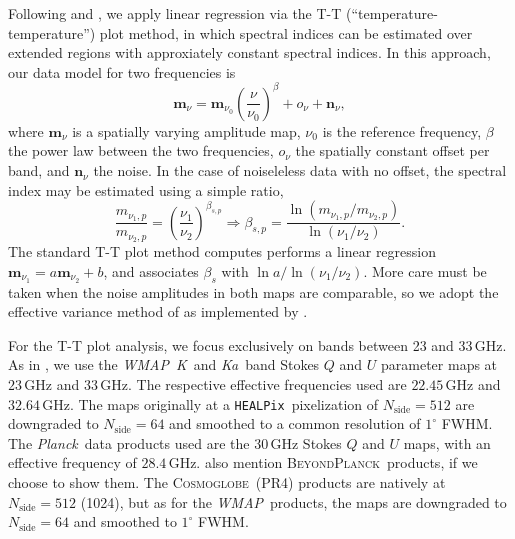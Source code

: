 \documentclass[twocolumn]{../../common/aa}
\def\WMAP{\emph{WMAP}}
\def\Planck{\emph{Planck}}
\def\healpix{\texttt{HEALPix}}
\newcommand{\red}[0]{\color{red}}
\newcommand{\BP}{\textsc{BeyondPlanck}}
\newcommand{\cosmoglobe}{\textsc{Cosmoglobe}}
\newcommand{\K}[0]{\textit K}
\newcommand{\Ka}[0]{\textit{Ka}}
\begin{document}
Following \citet{fuskeland2014} and \citet{fuskeland:2019}, we apply linear regression via the T-T (``temperature-temperature'') plot method, in which spectral indices can be estimated over extended regions with approxiately constant spectral indices. In this approach, our data model for two frequencies is
\begin{equation}
	\boldsymbol m_\nu = \boldsymbol m_{\nu_0}\left(\frac\nu{\nu_0}\right)^\beta+o_\nu+\boldsymbol n_\nu ,
\end{equation}
where $\boldsymbol m_\nu$ is a spatially varying amplitude map, $\nu_0$ is the reference frequency, $\beta$ the power law between the two frequencies, $o_\nu$ the spatially constant offset per band, and $\boldsymbol n_\nu$ the noise.  In the case of noiseleless data with no offset, the spectral index may be estimated using a simple ratio,
\begin{equation}
	\frac{m_{\nu_1,p}}{m_{\nu_2,p}}
	=\left(\frac{\nu_1}{\nu_2}\right)^{\beta_{s,p}}
	\Rightarrow
	\beta_{s,p}=\frac{\ln(m_{\nu_1,p}/m_{\nu_2,p})}{\ln(\nu_1/\nu_2)}.
\end{equation}
The standard T-T plot method computes performs a linear regression $\boldsymbol m_{\nu_1}=a\boldsymbol m_{\nu_2}+b$, and associates $\beta_s$ with $\ln a/\ln(\nu_1/\nu_2)$. More care must be taken when the noise amplitudes in both maps are comparable, so we adopt the effective variance method of \citet{orear1982} as implemented by \citet{fuskeland2014}.

For the T-T plot  analysis, we focus exclusively on bands between 23 and 33\,GHz. As in \citet{fuskeland2014}, we use the \WMAP\ \K\ and \Ka\ band Stokes $Q$ and $U$ parameter maps at $23$\,GHz and $33$\,GHz. The respective effective frequencies used are $22.45$\,GHz and $32.64$\,GHz. The maps originally at a \healpix\ pixelization of $N_\textrm{side}=512$ are downgraded to $N_\textrm{side}=64$ and smoothed to a common resolution of $1^\circ$ FWHM.
The \Planck\ data products used are the $30$\,GHz Stokes $Q$ and $U$ maps, with an effective frequency of $28.4$\,GHz. {\red also mention \BP\ products, if we choose to show them.} The \cosmoglobe\ (PR4) products are natively at $N_\textrm{side}=512$ (1024), but as for the \WMAP\ products, the maps are downgraded to $N_\textrm{side}=64$ and smoothed to $1^\circ$ FWHM.  
\end{document}
